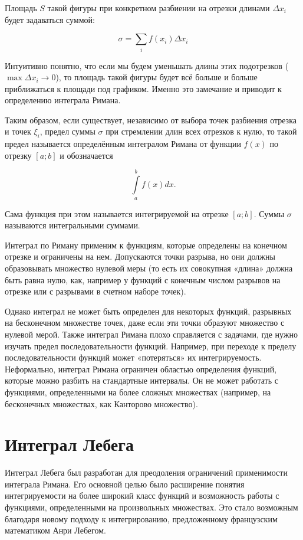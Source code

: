 \documentclass[a4paper,14pt]{extarticle}
\begin{document}
Площадь $S$ такой фигуры при конкретном разбиении на отрезки длинами $\Delta x_i$ будет задаваться суммой:

$$
\sigma = \sum_i f(x_i) \Delta x_i
$$

Интуитивно понятно, что если мы будем уменьшать длины этих подотрезков ($\max \Delta x_i \rightarrow 0$), то площадь такой фигуры будет всё больше и больше приближаться к площади под графиком. Именно это замечание и приводит к определению интеграла Римана. ~\cite{fichtenholz}

Таким образом, если существует, независимо от выбора точек разбиения отрезка и точек $\xi_i$, предел суммы $\sigma$ при стремлении длин всех отрезков к нулю, то такой предел называется определённым интегралом Римана от функции $f(x)$ по отрезку $[a; b]$ и обозначается

$$
\int\limits_a^b f(x) dx.
$$

Сама функция при этом называется интегрируемой на отрезке $[a; b]$. Суммы $\sigma$ называются интегральными суммами.

Интеграл по Риману применим к функциям, которые определены на конечном отрезке и ограничены на нем. Допускаются точки разрыва, но они должны образовывать множество нулевой меры (то есть их совокупная «длина» должна быть равна нулю, как, например у функций с конечным числом разрывов на отрезке или с разрывами в счетном наборе точек).

Однако интеграл не может быть определен для некоторых функций, разрывных на бесконечном множестве точек, даже если эти точки образуют множество с нулевой мерой. Также интеграл Римана плохо справляется с задачами, где нужно изучать предел последовательности функций. Например, при переходе к пределу последовательности функций может «потеряться» их интегрируемость. Неформально, интеграл Римана ограничен областью определения функций, которые можно разбить на стандартные интервалы. Он не может работать с функциями, определенными на более сложных множествах (например, на бесконечных множествах, как Канторово множество).

\newpage
\section{Интеграл Лебега}

Интеграл Лебега был разработан для преодоления ограничений применимости интеграла Римана. Его основной целью было расширение понятия интегрируемости на более широкий класс функций и возможность работы с функциями, определенными на произвольных множествах. Это стало возможным благодаря новому подходу к интегрированию, предложенному французским математиком Анри Лебегом.
\end{document}
